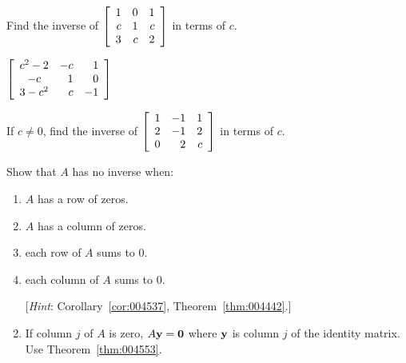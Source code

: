 \begin{multicols}{2}
\begin{ex}
\begin{sol}
\begin{enumerate}[label={\alph*.}]
\end{enumerate}
\end{sol}
\end{ex}

\begin{ex}
Find the inverse of $\left[ \begin{array}{rrr}
1 & 0 & 1 \\
c & 1 & c \\
3 & c & 2
\end{array} \right]$
 in terms of $c$.

\begin{sol}
$\left[ \begin{array}{crr}
c^{2} - 2 & -c & 1 \\
-c & 1 & 0 \\
3 - c^{2} & c & -1
\end{array} \right]$
\end{sol}
\end{ex}

\begin{ex}
If $c \neq 0$, find the inverse of $\left[ \begin{array}{rrr}
1 & -1 & 1 \\
2 & -1 & 2 \\
0 & 2 & c
\end{array} \right]$
 in terms of $c$.
\end{ex}

\begin{ex}
Show that $A$ has no inverse when:


\begin{enumerate}[label={\alph*.}]
\item $A$ has a row of zeros.

\item $A$ has a column of zeros.

\item each row of $A$ sums to $0$. 

\item each column of $A$ sums to $0$.


[\textit{Hint}: Corollary~\ref{cor:004537}, Theorem~\ref{thm:004442}.]

\end{enumerate}
\begin{sol}
\begin{enumerate}[label={\alph*.}]
\setcounter{enumi}{1}
\item  If column $j$ of $A$ is zero, $A\textbf{y} = \textbf{0}$ where $\textbf{y}$ is column $j$ of the identity matrix. Use Theorem~\ref{thm:004553}.


\end{enumerate}
\end{sol}
\end{ex}
\end{multicols}
